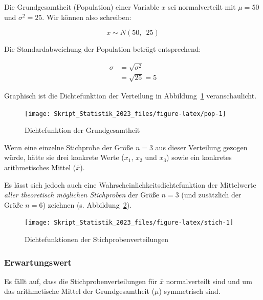 \documentclass[
  11pt,
  ngerman,
  a4paper,
]{report}
\begin{document}
Die Grundgesamtheit (Population) einer Variable \(x\) sei normalverteilt mit \(\mu=50\) und \(\sigma^2=25\). Wir können also schreiben:

\nopagebreak

\[ x \sim N(50, \enspace 25) \]

Die Standardabweichung der Population beträgt entsprechend:

\nopagebreak

\[\begin{aligned}
\sigma&=\sqrt{\sigma^2}\\[4pt]
&=\sqrt{25}=5\end{aligned}\]

Graphisch ist die Dichtefunktion der Verteilung in Abbildung~\ref{fig:pop} veranschaulicht.

\begin{figure}[!h]

{\centering \texttt{[image: Skript\_Statistik\_2023\_files/figure-latex/pop-1]} 

}

\caption{Dichtefunktion der Grundgesamtheit}\label{fig:pop}
\end{figure}

Wenn eine einzelne Stichprobe der Größe \(n=3\) aus dieser Verteilung gezogen würde, hätte sie drei konkrete Werte (\(x_1\), \(x_2\) und \(x_3\)) sowie ein konkretes arithmetisches Mittel (\(\bar{x}\)).

Es lässt sich jedoch auch eine Wahrscheinlichkeitsdichtefunktion der Mittelwerte \emph{aller theoretisch möglichen Stichproben} der Größe \(n=3\) (und zusätzlich der Größe \(n=6\)) zeichnen (s. Abbildung~\ref{fig:stich}).

\begin{figure}[!h]

{\centering \texttt{[image: Skript\_Statistik\_2023\_files/figure-latex/stich-1]} 

}

\caption{Dichtefunktionen der Stichprobenverteilungen}\label{fig:stich}
\end{figure}

\hypertarget{erwartungswert}{%
\subsubsection{Erwartungswert}\label{erwartungswert}}

Es fällt auf, dass die Stichprobenverteilungen für \(\bar{x}\) normalverteilt sind und um das arithmetische Mittel der Grundgesamtheit (\(\mu\)) symmetrisch sind.
\end{document}
